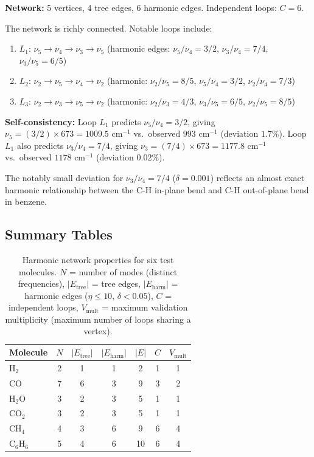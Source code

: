 \documentclass[11pt,twocolumn,a4paper]{article}
\theoremstyle{definition}
\theoremstyle{remark}
\begin{document}
\textbf{Network:} 5 vertices, 4 tree edges, 6 harmonic edges. Independent loops: $C = 6$.

The network is richly connected. Notable loops include:
\begin{enumerate}[nosep]
\item $L_1$: $\nu_5 \to \nu_4 \to \nu_3 \to \nu_5$ (harmonic edges: $\nu_5/\nu_4 = 3/2$, $\nu_3/\nu_4 = 7/4$, $\nu_3/\nu_5 = 6/5$)
\item $L_2$: $\nu_2 \to \nu_5 \to \nu_4 \to \nu_2$ (harmonic: $\nu_2/\nu_5 = 8/5$, $\nu_5/\nu_4 = 3/2$, $\nu_2/\nu_4 = 7/3$)
\item $L_3$: $\nu_2 \to \nu_3 \to \nu_5 \to \nu_2$ (harmonic: $\nu_2/\nu_3 = 4/3$, $\nu_3/\nu_5 = 6/5$, $\nu_2/\nu_5 = 8/5$)
\end{enumerate}

\textbf{Self-consistency:} Loop $L_1$ predicts $\nu_5/\nu_4 = 3/2$, giving $\nu_5 = (3/2) \times 673 = 1009.5$ cm$^{-1}$ vs.\ observed $993$ cm$^{-1}$ (deviation $1.7\%$). Loop $L_1$ also predicts $\nu_3/\nu_4 = 7/4$, giving $\nu_3 = (7/4) \times 673 = 1177.8$ cm$^{-1}$ vs.\ observed $1178$ cm$^{-1}$ (deviation $0.02\%$).

The notably small deviation for $\nu_3/\nu_4 = 7/4$ ($\delta = 0.001$) reflects an almost exact harmonic relationship between the C-H in-plane bend and C-H out-of-plane bend in benzene.

\subsection{Summary Tables}
\label{subsec:tables}

\begin{table}[H]
\centering
\caption{Harmonic network properties for six test molecules. $N$ = number of modes (distinct frequencies), $|E_{\mathrm{tree}}|$ = tree edges, $|E_{\mathrm{harm}}|$ = harmonic edges ($\eta \leq 10$, $\delta < 0.05$), $C$ = independent loops, $V_{\mathrm{mult}}$ = maximum validation multiplicity (maximum number of loops sharing a vertex).}
\label{tab:network_properties}
\begin{tabular}{@{}lcccccc@{}}
\toprule
Molecule & $N$ & $|E_{\mathrm{tree}}|$ & $|E_{\mathrm{harm}}|$ & $|E|$ & $C$ & $V_{\mathrm{mult}}$ \\
\midrule
H$_2$     & 2 & 1 & 1 & 2 & 1 & 1 \\
CO        & 7 & 6 & 3 & 9 & 3 & 2 \\
H$_2$O    & 3 & 2 & 3 & 5 & 1 & 1 \\
CO$_2$    & 3 & 2 & 3 & 5 & 1 & 1 \\
CH$_4$    & 4 & 3 & 6 & 9 & 6 & 4 \\
C$_6$H$_6$ & 5 & 4 & 6 & 10 & 6 & 4 \\
\bottomrule
\end{tabular}
\end{table}
\end{document}

